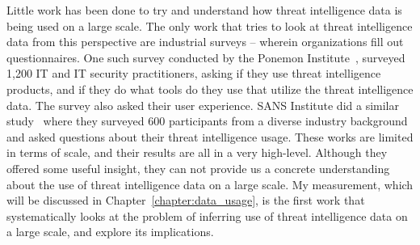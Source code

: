 Little work has been done to try and understand how threat
intelligence data is being used on a large scale. The only work that tries to
look at threat intelligence data from this perspective are industrial surveys
-- wherein organizations fill out questionnaires. One such survey conducted by
the Ponemon Institute~\cite{ponemon2018cti}, surveyed 1,200 IT and IT
security practitioners, asking if they use threat intelligence products, and
if they do what tools do they use that utilize the threat intelligence data.
The survey also asked their user experience. SANS Institute did a
similar study~\cite{shackleford2017cyber} where they surveyed 600
participants from a diverse industry background and asked questions about
their threat intelligence usage. These works are limited in terms
of scale, and their results are all in a very high-level. Although they offered
some useful insight, they can not provide us a concrete understanding
about the use of threat intelligence data on a large scale. My measurement,
which will be discussed in Chapter~\ref{chapter:data_usage},
is the first work that systematically looks at the problem of inferring use
of threat intelligence data on a large scale, and explore its implications.

